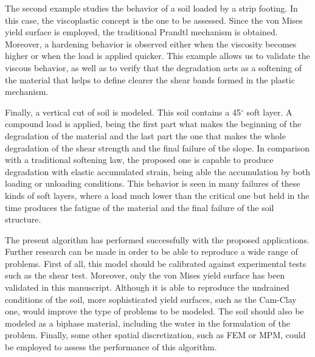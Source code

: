 \documentclass[applsci,journal,article,submit,moreauthors,pdftex]{Definitions/mdpi}
\begin{document}
The second example studies the behavior of a soil loaded by a strip footing. In this case, the viscoplastic concept is the one to be assessed. Since the von Mises yield surface is employed, the traditional Prandtl mechanism is obtained. Moreover, a hardening behavior is observed either when the viscosity becomes higher or when the load is applied quicker. This example allows us to validate the viscous behavior, as well as to verify that the degradation acts as a softening of the material that helps to define clearer the shear bands formed in the plastic mechanism.

Finally, a vertical cut of soil is modeled. This soil contains a 45$^\circ$ soft layer. A compound load is applied, being the first part what makes the beginning of the degradation of the material and the last part the one that makes the whole degradation of the shear strength and the final failure of the slope. In comparison with a traditional softening law, the proposed one is capable to produce degradation with elastic accumulated strain, being able the accumulation by both loading or unloading conditions. This behavior is seen in many failures of these kinds of soft layers, where a load much lower than the critical one but held in the time produces the fatigue of the material and the final failure of the soil structure. 

The present algorithm has performed successfully with the proposed applications. Further research can be made in order to be able to reproduce a wide range of problems. First of all, this model should be calibrated against experimental tests such as the shear test. Moreover, only the von Mises yield surface has been validated in this manuscript. Although it is able to reproduce the undrained conditions of the soil, more sophisticated yield surfaces, such as the Cam-Clay one, would improve the type of problems to be modeled. The soil should also be modeled as a biphase material, including the water in the formulation of the problem. Finally, some other spatial discretization, such as FEM or MPM, could be employed to assess the performance of this algorithm.

\vspace{6pt} 


\end{document}
